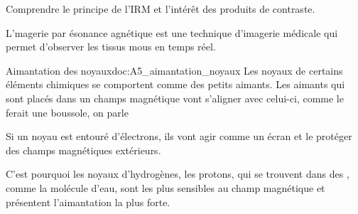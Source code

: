 \teteTermStssImag

\vspace*{-36pt}


\begin{objectifs}
  \item Comprendre le principe de l'IRM et l'intérêt des produits de contraste.
\end{objectifs}

\begin{contexte}
  L'magerie par ésonance agnétique est une technique d'imagerie médicale qui permet d'observer les tissus mous en temps réel.

\end{contexte}


\begin{doc}{Aimantation des noyaux}{doc:A5_aimantation_noyaux}
  Les noyaux de certains éléments chimiques se comportent comme des petits aimants.
  Les aimants qui sont placés dans un champs magnétique vont s'aligner avec celui-ci, comme le ferait une boussole, on parle 
  
  Si un noyau est entouré d'électrons, ils vont agir comme un écran et le protéger des champs magnétiques extérieurs.

  C'est pourquoi les noyaux d'hydrogènes, les protons, qui se trouvent dans des , comme la molécule d'eau, sont les plus sensibles au champ magnétique et présentent l'aimantation la plus forte.
\end{doc}

